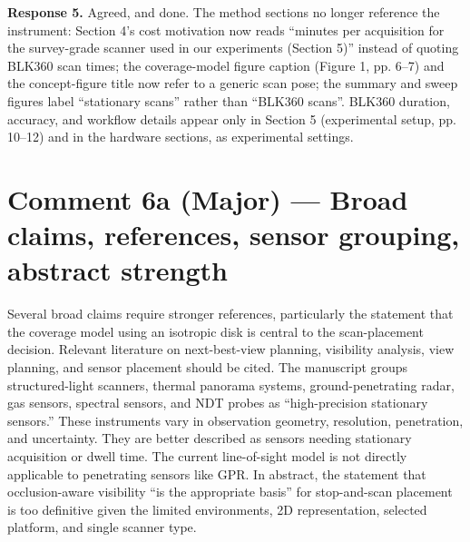 \textbf{Response 5.} Agreed, and done. The method sections no longer reference the instrument: Section 4’s cost motivation now reads “minutes per acquisition for the survey-grade scanner used in our experiments (Section 5)” instead of quoting BLK360 scan times; the coverage-model figure caption (Figure 1, pp. 6–7) and the concept-figure title now refer to a generic scan pose; the summary and sweep figures label “stationary scans” rather than “BLK360 scans”. BLK360 duration, accuracy, and workflow details appear only in Section 5 (experimental setup, pp. 10–12) and in the hardware sections, as experimental settings.

\section*{Comment 6a (Major) — Broad claims, references, sensor grouping, abstract strength}

\begin{quoting}
Several broad claims require stronger references, particularly the statement that the coverage model using an isotropic disk is central to the scan-placement decision. Relevant literature on next-best-view planning, visibility analysis, view planning, and sensor placement should be cited. The manuscript groups structured-light scanners, thermal panorama systems, ground-penetrating radar, gas sensors, spectral sensors, and NDT probes as “high-precision stationary sensors.” These instruments vary in observation geometry, resolution, penetration, and uncertainty. They are better described as sensors needing stationary acquisition or dwell time. The current line-of-sight model is not directly applicable to penetrating sensors like GPR. In abstract, the statement that occlusion-aware visibility “is the appropriate basis” for stop-and-scan placement is too definitive given the limited environments, 2D representation, selected platform, and single scanner type.
\end{quoting}

